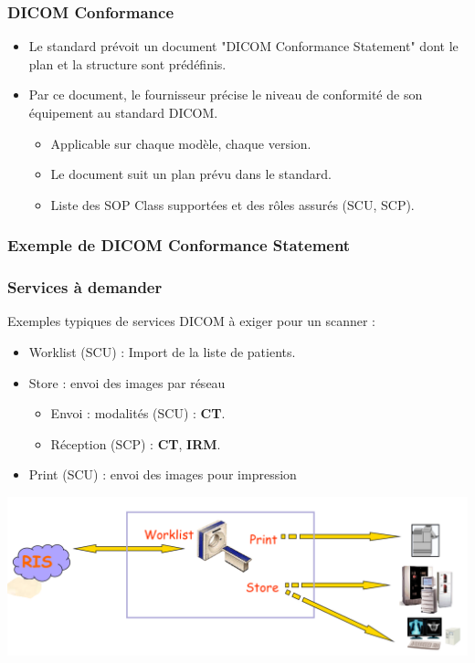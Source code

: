 \frame
{
	\frametitle{DICOM Conformance}
	\begin{itemize}
		\item Le standard pr\'evoit un document "DICOM Conformance Statement" dont le plan et la structure sont pr\'ed\'efinis.
		\item Par ce document, le fournisseur pr\'ecise le niveau de conformit\'e de son \'equipement au standard DICOM.
		\begin{itemize}
			\item Applicable sur chaque mod\`ele, chaque version.
			\item Le document suit un plan pr\'evu dans le standard.
			\item Liste des SOP Class support\'ees et des r\^oles assur\'es (SCU, SCP).
		\end{itemize}
	\end{itemize}
}

\frame
{
	\frametitle{Exemple de DICOM Conformance Statement}
}

\frame
{
	\frametitle{Services \`a demander}
	Exemples typiques de services DICOM \`a exiger pour un scanner :
	\begin{itemize}
		\item Worklist (SCU) : Import de la liste de patients.
		\item Store : envoi des images par r\'eseau
		\begin{itemize}
			\item Envoi : modalit\'es (SCU) : \textbf{CT}.
			\item R\'eception (SCP) : \textbf{CT}, \textbf{IRM}.
		\end{itemize}
		\item Print (SCU) : envoi des images pour impression
	\end{itemize}
	
	\begin{center}
		\includegraphics[width=\linewidth]{./figures/services-ct.png}
	\end{center}

}

